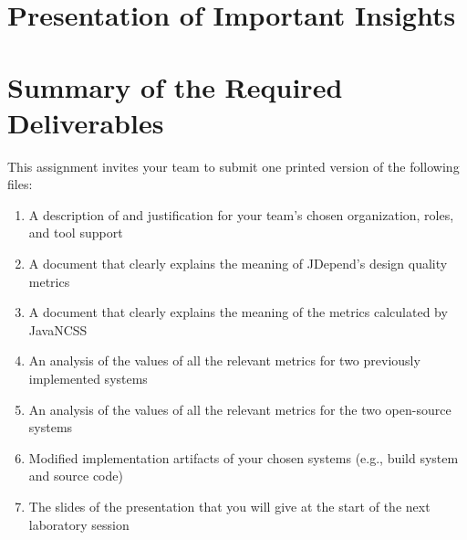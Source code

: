 \section*{Presentation of Important Insights}

\section*{Summary of the Required Deliverables}

This assignment invites your team to submit one printed version of the following files:
\vspace*{-.1in}
\begin{enumerate}
    \itemsep0em
    \item A description of and justification for your team's chosen organization, roles, and tool support
    \item A document that clearly explains the meaning of JDepend's design quality metrics
    \item A document that clearly explains the meaning of the metrics calculated by JavaNCSS
    \item An analysis of the values of all the relevant metrics for two previously implemented systems
    \item An analysis of the values of all the relevant metrics for the two open-source systems
    \item Modified implementation artifacts of your chosen systems (e.g., build system and source code)
    \item The slides of the presentation that you will give at the start of the next laboratory session
\end{enumerate}
\vspace*{-.1in}



